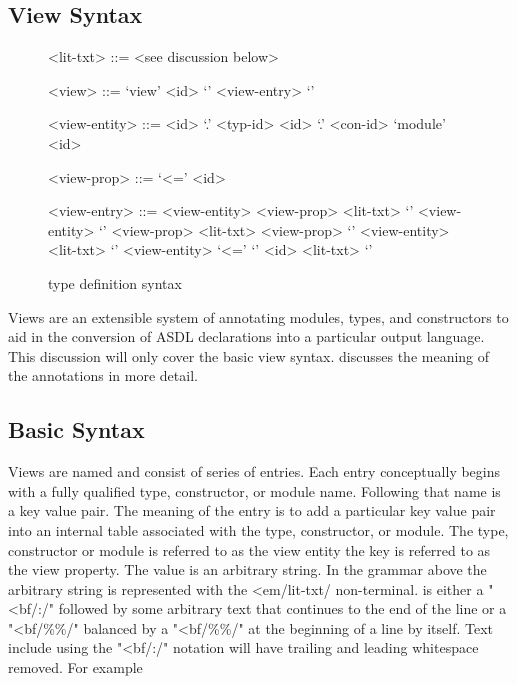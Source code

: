 \subsection{View Syntax}
\begin{figure}[ht]
  \begin{center}
    \begin{grammar}
      <lit-txt>     ::= <see discussion below>

      <view>        ::= `view' <id> `{' { <view-entry> } `}'

      <view-entity> ::= <id> `.' <typ-id>
		  `.' <con-id>
		 \alt{} `module' <id>

      <view-prop>   ::= `<='  <id>

      <view-entry>  ::= <view-entity>  <view-prop> <lit-txt>
		 \alt{} `{' {<view-entity>} `}' <view-prop> <lit-txt>
		 \alt{} <view-prop> `{' {<view-entity> <lit-txt>} `}'
		 \alt{} <view-entity> `<=' `{' {<id> <lit-txt>} `}'
    \end{grammar}
  \end{center}
  \caption{\asdl{} type definition syntax}
\end{figure}%

Views are an extensible system of annotating modules, types, and
constructors to aid in the conversion of ASDL declarations into a
particular output language. This discussion will only cover the basic view
syntax.
 discusses the meaning of the annotations in more detail.

\subsection{Basic Syntax}
Views are named and consist of series of entries.
Each entry conceptually
begins with a fully qualified type, constructor, or module name. Following
that name is a key value pair.
The meaning of the entry is to add a
particular key value pair into an internal table associated with the type,
constructor, or module.
The type, constructor or module is referred to as
the view entity the key is referred to as the view property.
The value is an arbitrary string.
In the grammar above the arbitrary string is represented
with the <em/lit-txt/ non-terminal.  is either a "<bf/:/"
followed by some arbitrary text that continues to the end of the line or a
"<bf/\%\%/" balanced by a "<bf/\%\%/" at the beginning of a line by itself. 
Text include using the "<bf/:/" notation will have trailing and leading 
whitespace removed. For example

